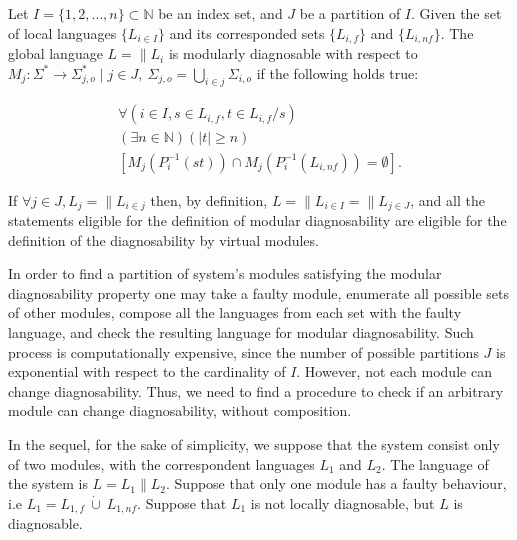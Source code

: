 \documentclass[a4paper, 10pt, conference]{ieeeconf}
\begin{document}
\begin{definition} Let $I = \{1,2,\ldots,n\}
\subset  \mathbb{N}$ be an index set, and $J$ be a partition of $I$. Given the
set of local languages $\{L_{i \in I}\}$ and its corresponded sets $\{L_{i,f}\}$
and $\{L_{i,nf}\}$. The global language $L = \parallel L_i$ is modularly
diagnosable with respect to 
$M_j: \Sigma^* \rightarrow \Sigma_{j,o}^* 
\mid j \in J, ~\Sigma_{j,o} =\bigcup_{i \in j} \Sigma_{i,o}$ 
if the following holds true:
\end{definition}
\begin{equation}
\begin{array}{l}
	\forall(i \in I, s \in L_{i,f}, t \in L_{i,f}/s)
	\\
	(\exists n \in \mathbb{N})
	(|t| \geq n)
	\\
	\left[ M_j(P_i^{-1}(st)) \cap M_j(P_i^{-1}(L_{i,nf})) = \emptyset \right].
\end{array}
\end{equation}

If $\forall j \in J, L_{j} = \parallel L_{i \in j}$ then, by definition, $L =
\parallel L_{i \in I} = \parallel L_{j \in J}$, and all the statements eligible
for the definition of modular diagnosability are eligible for the definition of
the diagnosability by virtual modules.

In order to find a partition of system's modules satisfying the modular
diagnosability property one may take a faulty module, enumerate all possible
sets of other modules, compose all the languages from each set with the faulty
language, and check the resulting language for modular diagnosability.
Such process is computationally expensive, since the number of possible
partitions $J$ is exponential with respect to the cardinality of $I$. However,
not each module can change diagnosability. Thus, we need to find a procedure to
check if an arbitrary module can change diagnosability, without composition.

In the sequel, for the sake of simplicity, we suppose that the system consist
only of two modules, with the correspondent languages $L_1$ and $L_2$. The
language of the system is $L = L_1 \parallel L_2$. Suppose that only one module
has a faulty behaviour, i.e $L_1 = L_{1,f} ~\dot{\cup}~ L_{1,nf}$.
Suppose that $L_1$ is not locally diagnosable, but $L$ is diagnosable.
\end{document}
